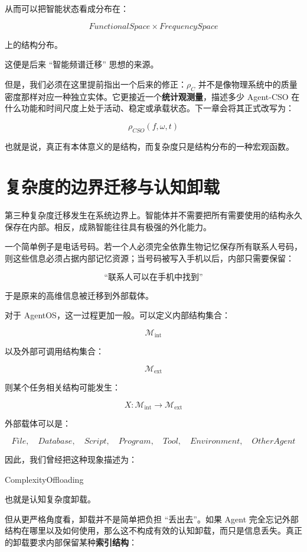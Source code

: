 从而可以把智能状态看成分布在：

\[
FunctionalSpace
\times
FrequencySpace
\]

上的结构分布。

这便是后来 ``智能频谱迁移'' 思想的来源。

但是，我们必须在这里提前指出一个后来的修正：$\rho_C$ 并不是像物理系统中的质量密度那样对应一种独立实体。它更接近一个\textbf{统计观测量}，描述多少 Agent-CSO 在什么功能和时间尺度上处于活动、稳定或承载状态。下一章会将其正式改写为：

\[
\rho_{CSO}(f,\omega,t)
\]

也就是说，真正有本体意义的是结构，而复杂度只是结构分布的一种宏观函数。

\section{复杂度的边界迁移与认知卸载}
\label{sec:boundary-complexity-migration}

第三种复杂度迁移发生在系统边界上。智能体并不需要把所有需要使用的结构永久保存在内部。相反，成熟智能往往具有极强的外化能力。

一个简单例子是电话号码。若一个人必须完全依靠生物记忆保存所有联系人号码，则这些信息必须占据内部记忆资源；当号码被写入手机以后，内部只需要保留：

\[
\text{``联系人可以在手机中找到''}
\]

于是原来的高维信息被迁移到外部载体。

对于 AgentOS，这一过程更加一般。可以定义内部结构集合：

\[
\mathcal{M}_{\mathrm{int}}
\]

以及外部可调用结构集合：

\[
\mathcal{M}_{\mathrm{ext}}
\]

则某个任务相关结构可能发生：

\[
X:
\mathcal{M}_{\mathrm{int}}
\rightarrow
\mathcal{M}_{\mathrm{ext}}
\]

外部载体可以是：

\[
File,\quad
Database,\quad
Script,\quad
Program,\quad
Tool,\quad
Environment,\quad
OtherAgent
\]

因此，我们曾经把这种现象描述为：

\begin{statementbox}
ComplexityOffloading
\end{statementbox}

也就是认知复杂度卸载。

但从更严格角度看，卸载并不是简单把负担 ``丢出去''。如果 Agent 完全忘记外部结构在哪里以及如何使用，那么这不构成有效的认知卸载，而只是信息丢失。真正的卸载要求内部保留某种\textbf{索引结构}：

